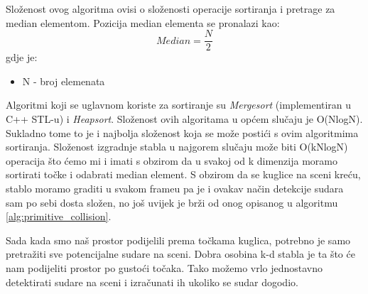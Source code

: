 Složenost ovog algoritma ovisi o složenosti operacije sortiranja i pretrage za median elementom. Pozicija median elementa se pronalazi kao:
\begin{equation}
	Median =\frac{N}{2}
\end{equation}
gdje je:
\begin{itemize}
	\item N - broj elemenata
\end{itemize}
Algoritmi koji se uglavnom koriste za sortiranje su \emph{Mergesort} (implementiran u C++ STL-u) i \emph{Heapsort}. Složenost ovih algoritama u općem slučaju je O(NlogN). Sukladno tome to je i najbolja složenost koja se može postići s ovim algoritmima sortiranja. Složenost izgradnje stabla u najgorem slučaju može biti O(kNlogN) operacija što ćemo mi i imati s obzirom da u svakoj od k dimenzija moramo sortirati točke i odabrati median element. S obzirom da se kuglice na sceni kreću, stablo moramo graditi u svakom frameu pa je i ovakav način detekcije sudara sam po sebi dosta složen, no još uvijek je brži od onog opisanog u algoritmu \ref{alg:primitive_collision}. 

Sada kada smo naš prostor podijelili prema točkama kuglica, potrebno je samo pretražiti sve potencijalne sudare na sceni. Dobra osobina k-d stabla je ta što će nam podijeliti prostor po gustoći točaka. Tako možemo vrlo jednostavno detektirati sudare na sceni i izračunati ih ukoliko se sudar dogodio.

